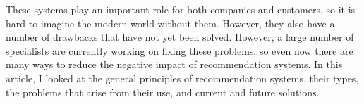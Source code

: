 \documentclass[10pt,twoside,slovak,a4paper]{article}
\begin{document}
These systems play an important role for both companies and customers, so it is hard to imagine the modern world without them. However, they also have a number of drawbacks that have not yet been solved. However, a large number of specialists are currently working on fixing these problems, so even now there are many ways to reduce the negative impact of recommendation systems. In this article, I looked at the general principles of recommendation systems, their types, the problems that arise from their use, and current and future solutions.



\newpage


\end{document}
